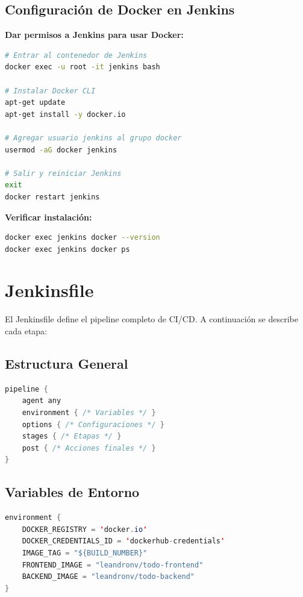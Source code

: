 \documentclass[12pt,a4paper]{article}
\begin{document}
\subsection{Configuración de Docker en Jenkins}

\textbf{Dar permisos a Jenkins para usar Docker:}
\begin{lstlisting}[language=bash]
# Entrar al contenedor de Jenkins
docker exec -u root -it jenkins bash

# Instalar Docker CLI
apt-get update
apt-get install -y docker.io

# Agregar usuario jenkins al grupo docker
usermod -aG docker jenkins

# Salir y reiniciar Jenkins
exit
docker restart jenkins
\end{lstlisting}

\textbf{Verificar instalación:}
\begin{lstlisting}[language=bash]
docker exec jenkins docker --version
docker exec jenkins docker ps
\end{lstlisting}

\newpage

\section{Jenkinsfile}

El Jenkinsfile define el pipeline completo de CI/CD. A continuación se describe cada etapa:

\subsection{Estructura General}

\begin{lstlisting}[language=Java, caption=Estructura del Jenkinsfile]
pipeline {
    agent any
    environment { /* Variables */ }
    options { /* Configuraciones */ }
    stages { /* Etapas */ }
    post { /* Acciones finales */ }
}
\end{lstlisting}

\subsection{Variables de Entorno}

\begin{lstlisting}[language=Java]
environment {
    DOCKER_REGISTRY = 'docker.io'
    DOCKER_CREDENTIALS_ID = 'dockerhub-credentials'
    IMAGE_TAG = "${BUILD_NUMBER}"
    FRONTEND_IMAGE = "leandronv/todo-frontend"
    BACKEND_IMAGE = "leandronv/todo-backend"
}
\end{lstlisting}
\end{document}
